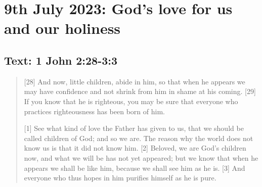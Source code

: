 \setcounter{figure}{0}

\section{9th July 2023: God's love for us and our holiness}
\subsection*{Text: 1 John 2:28-3:3}
  \begin{quote}
    [28] And now, little children, abide in him, so that when he appears we may have confidence and not shrink from him in shame at his coming. [29] If you know that he is righteous, you may be sure that everyone who practices righteousness has been born of him.

    [1] See what kind of love the Father has given to us, that we should be called children of God; and so we are. The reason why the world does not know us is that it did not know him. [2] Beloved, we are God’s children now, and what we will be has not yet appeared; but we know that when he appears we shall be like him, because we shall see him as he is. [3] And everyone who thus hopes in him purifies himself as he is pure.
  \end{quote}
